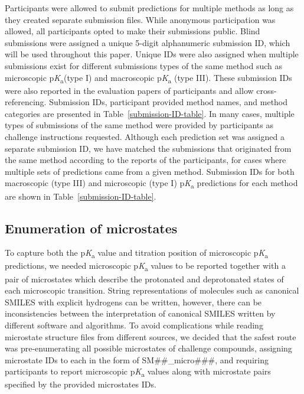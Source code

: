 \documentclass[9pt,lineno,final]{elife}
\newcommand{\pKa}{p\textit{K}\textsubscript{a}}
\begin{document}
Participants were allowed to submit predictions for multiple methods as long as they created separate submission files. 
While anonymous participation was allowed, all participants opted to make their submissions public.
Blind submissions were assigned a unique 5-digit alphanumeric submission ID, which will be used throughout this paper. Unique IDs were also assigned when multiple submissions exist for different submissions types of the same method such as microscopic \pKa{}(type I) and macroscopic \pKa{} (type III). 
These submission IDs were also reported in the evaluation papers of participants and allow cross-referencing. 
Submission IDs, participant provided method names, and method categories are presented in Table~\ref{submission-ID-table}. 
In many cases, multiple types of submissions of the same method were provided by participants as challenge instructions requested. 
Although each prediction set was assigned a separate submission ID, we have matched the submissions that originated from the same method according to the reports of the participants, for cases where multiple sets of predictions came from a given method.
Submission IDs for both macroscopic (type III) and microscopic (type I) \pKa{} predictions for each method are shown in Table~\ref{submission-ID-table}. 

\subsection{Enumeration of microstates} \label{section-enumeration-of-microstates}

To capture both the \pKa{} value and titration position of microscopic \pKa{} predictions, we needed microscopic \pKa{} values to be reported together with a pair of microstates which describe the protonated and deprotonated states of each microscopic transition.
String representations of molecules such as canonical SMILES with explicit hydrogens can be written, however, there can be inconsistencies between the interpretation of canonical SMILES written by different software and algorithms.
To avoid complications while reading microstate structure files from different sources, we decided that the safest route was pre-enumerating all possible microstates of challenge compounds, assigning microstate IDs to each in the form of SM\#\#\_micro\#\#\#, and requiring participants to report microscopic \pKa{} values along with microstate pairs specified by the provided microstates IDs.   
\end{document}
